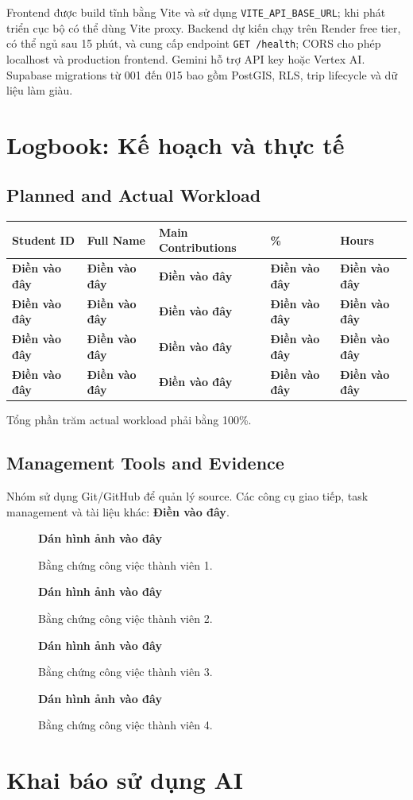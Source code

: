 \documentclass[12pt,a4paper]{article}
\newcommand{\dienvao}{\textbf{Điền vào đây}}
\newcommand{\danhinh}[1]{%
  \begin{figure}[H]
    \centering
    \begin{tcolorbox}[width=0.88\textwidth,height=5cm,valign=center,colback=gray!5,colframe=gray!45]
      \centering\Large\textbf{Dán hình ảnh vào đây}
    \end{tcolorbox}
    \caption{#1}
  \end{figure}
}
\begin{document}
Frontend được build tĩnh bằng Vite và sử dụng \texttt{VITE\_API\_BASE\_URL}; khi phát triển cục bộ có thể dùng Vite proxy. Backend dự kiến chạy trên Render free tier, có thể ngủ sau 15 phút, và cung cấp endpoint \texttt{GET /health}; CORS cho phép localhost và production frontend. Gemini hỗ trợ API key hoặc Vertex AI. Supabase migrations từ 001 đến 015 bao gồm PostGIS, RLS, trip lifecycle và dữ liệu làm giàu.

\section{Logbook: Kế hoạch và thực tế}

\subsection{Planned and Actual Workload}


\begin{longtable}{|C{2.5cm}|C{3.0cm}|C{5.5cm}|C{1.5cm}|C{1.8cm}|}
\hline
\textbf{Student ID} & \textbf{Full Name} & \textbf{Main Contributions} & \textbf{\%} & \textbf{Hours} \\ \hline
\endhead
\dienvao & \dienvao & \dienvao & \dienvao & \dienvao \\ \hline
\dienvao & \dienvao & \dienvao & \dienvao & \dienvao \\ \hline
\dienvao & \dienvao & \dienvao & \dienvao & \dienvao \\ \hline
\dienvao & \dienvao & \dienvao & \dienvao & \dienvao \\ \hline
\end{longtable}

Tổng phần trăm actual workload phải bằng 100\%.

\subsection{Management Tools and Evidence}


Nhóm sử dụng Git/GitHub để quản lý source. Các công cụ giao tiếp, task management và tài liệu khác: \dienvao.

\danhinh{Bằng chứng công việc thành viên 1.}
\danhinh{Bằng chứng công việc thành viên 2.}
\danhinh{Bằng chứng công việc thành viên 3.}
\danhinh{Bằng chứng công việc thành viên 4.}

\section{Khai báo sử dụng AI}
\end{document}
